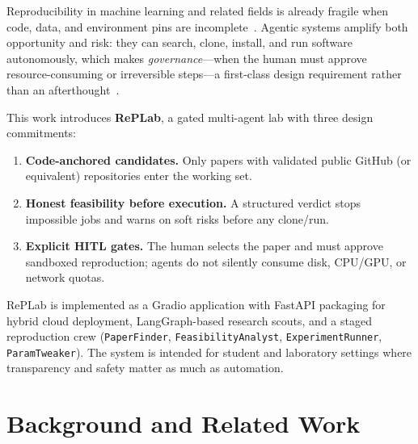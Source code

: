 \documentclass[11pt,a4paper]{article}
\begin{document}
Reproducibility in machine learning and related fields is already fragile when
code, data, and environment pins are incomplete~\cite{pineau2021}. Agentic
systems amplify both opportunity and risk: they can search, clone, install, and
run software autonomously, which makes \emph{governance}---when the human must
approve resource-consuming or irreversible steps---a first-class design
requirement rather than an afterthought~\cite{autogen,chains2026}.

This work introduces \textbf{RePLab}, a gated multi-agent lab with three design
commitments:
\begin{enumerate}[leftmargin=*,itemsep=2pt]
  \item \textbf{Code-anchored candidates.} Only papers with validated public
        GitHub (or equivalent) repositories enter the working set.
  \item \textbf{Honest feasibility before execution.} A structured verdict
        stops impossible jobs and warns on soft risks before any clone/run.
  \item \textbf{Explicit HITL gates.} The human selects the paper and must
        approve sandboxed reproduction; agents do not silently consume disk,
        CPU/GPU, or network quotas.
\end{enumerate}

RePLab is implemented as a Gradio application with FastAPI packaging for hybrid
cloud deployment, LangGraph-based research scouts, and a staged reproduction
crew (\texttt{PaperFinder}, \texttt{FeasibilityAnalyst},
\texttt{ExperimentRunner}, \texttt{ParamTweaker}). The system is intended for
student and laboratory settings where transparency and safety matter as much as
automation.

\section{Background and Related Work}
\label{sec:background}
\end{document}
